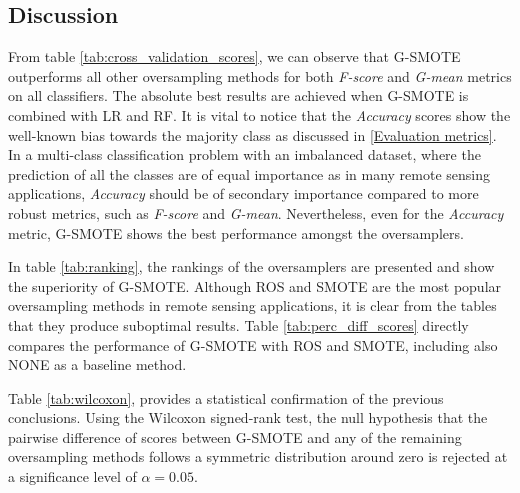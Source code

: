\documentclass[remotesensing,article,submit,moreauthors,pdftex]{Definitions/mdpi}
\begin{document}

\subsection{Discussion}

From table \ref{tab:cross_validation_scores}, we can observe that G-SMOTE outperforms all other oversampling methods for both \textit{F-score} and \textit{G-mean} metrics on all classifiers. The absolute best results are achieved when G-SMOTE is combined with LR and RF. It is vital to notice that the \textit{Accuracy} scores show the well-known bias towards the majority class as discussed in \ref{Evaluation metrics}. In a multi-class classification problem with an imbalanced dataset, where the prediction of all the classes are of equal importance as in many remote sensing applications, \textit{Accuracy} should be of secondary importance compared to more robust metrics, such as \textit{F-score} and \textit{G-mean}. Nevertheless, even for the \textit{Accuracy} metric, G-SMOTE shows the best performance amongst the oversamplers.

In table \ref{tab:ranking}, the rankings of the oversamplers are presented
and show the superiority of G-SMOTE. Although ROS and SMOTE are the most popular
oversampling methods in remote sensing applications, it is clear from the tables
that they produce suboptimal results. Table \ref{tab:perc_diff_scores} directly compares the performance of G-SMOTE with ROS and SMOTE, including also NONE as a baseline method.

Table \ref{tab:wilcoxon}, provides a statistical confirmation of the previous conclusions. Using the Wilcoxon signed-rank test, the null hypothesis that the pairwise difference of scores between G-SMOTE and any of the remaining oversampling methods follows a symmetric distribution around zero is rejected at a significance level of $\alpha = 0.05$. 
\end{document}
